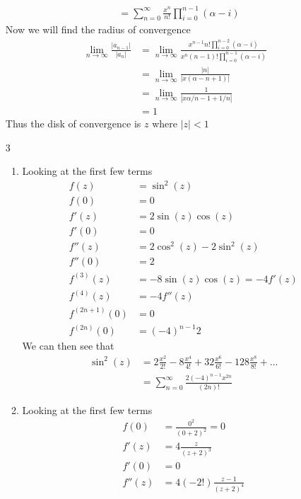 \documentclass{article}
\begin{document}
\begin{enumerate}
\begin{align*}
        &=\sum_{n=0}^\infty\frac{x^n}{n!}\prod_{i=0}^{n-1}(\alpha-i)
      \end{align*}
      Now we will find the radius of convergence
      \begin{align*}
        \lim_{n\to\infty}\frac{|a_{n-1}|}{|a_n|}&=\lim_{n\to\infty}\frac{x^{n-1}n!\prod_{i=0}^{n-2}(\alpha-i)}{x^n(n-1)!\prod_{i=0}^{n-1}(\alpha-i)}\\
        &=\lim_{n\to\infty}\frac{|n|}{|x(\alpha-n+1)|}\\
        &=\lim_{n\to\infty}\frac{1}{|x\alpha/n-1+1/n|}\\
        &=1
      \end{align*}
      Thus the disk of convergence is $z$ where $|z|<1$
    \item[3]%
      \begin{enumerate}[label=(\roman*)]
        \item
          Looking at the first few terms
          \begin{align*}
            f(z)&=\sin^2(z)\\
            f(0)&=0\\
            f'(z)&=2\sin(z)\cos(z)\\
            f'(0)&=0\\
            f''(z)&=2\cos^2(z)-2\sin^2(z)\\
            f''(0)&=2\\
            f^{(3)}(z)&=-8\sin(z)\cos(z)=-4f'(z)\\
            f^{(4)}(z)&=-4f''(z)\\
            f^{(2n+1)}(0)&=0\\
            f^{(2n)}(0)&=(-4)^{n-1}2
          \end{align*}
          We can then see that
          \begin{align*}
            \sin^2(z)&=2\frac{x^2}{2!}-8\frac{x^4}{4!}+32\frac{x^6}{6!}-128\frac{x^8}{8!}+...\\
            &=\sum_{n=0}^\infty\frac{2(-4)^{n-1}x^{2n}}{(2n)!}
          \end{align*}
        \item
          Looking at the first few terms
          \begin{align*}
            f(0)&=\frac{0^2}{(0+2)^{2}}=0\\
            f'(z)&=4\frac{z}{(z+2)^3}\\
            f'(0)&=0\\
            f''(z)&=4(-2!)\frac{z-1}{(z+2)^4}\\

\end{align*}
\end{enumerate}
\end{enumerate}
\end{document}
